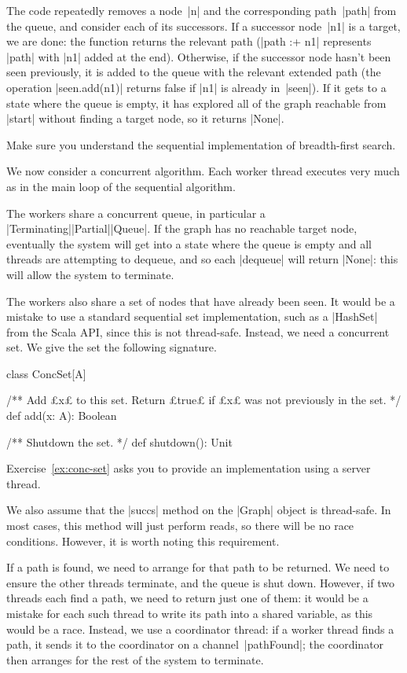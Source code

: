 The code repeatedly removes a node~|n| and the corresponding path~|path| from
the queue, and consider each of its successors.  If a successor node~|n1| is a
target, we are done: the function returns the relevant path (|path :+ n1|
represents |path| with |n1| added at the end).  Otherwise, if the successor
node hasn't been seen previously, it is added to the queue with the relevant
extended path (the operation |seen.add(n1)| returns false if |n1| is already
in~|seen|).  If it gets to a state where the queue is empty, it has explored
all of the graph reachable from |start| without finding a target node, so it
returns |None|.

\begin{instruction}
Make sure you understand the sequential implementation of breadth-first search.
\end{instruction}


We now consider a concurrent algorithm.  Each worker thread  executes very
much as in the main loop of the sequential algorithm.

The workers share a concurrent queue, in particular a
|Terminating|\-|Partial|\-|Queue|.  If the graph has no reachable
target node, eventually the system will get into a state where the queue is
empty and all threads are attempting to dequeue, and so each |dequeue| will
return |None|: this will allow the system to terminate.

The workers also share a set of nodes that have already been seen.  It would
be a mistake to use a standard sequential set implementation, such as a
|HashSet| from the Scala API, since this is not thread-safe.  Instead, we need
a concurrent set.  We give the set the following signature.
%
\begin{scala}
class ConcSet[A]{
  /** Add £x£ to this set.  Return £true£ if £x£ was not previously in the set. */
  def add(x: A): Boolean

  /** Shutdown the set. */
  def shutdown(): Unit
}
\end{scala}
%
Exercise~\ref{ex:conc-set} asks you to provide an implementation using a
server thread.

We also assume that the |succs| method on the |Graph| object is thread-safe.
In most cases, this method will just perform reads, so there will be no race
conditions.  However, it is worth noting this requirement. 

If a path is found, we need to arrange for that path to be returned.  We need
to ensure the other threads terminate, and the queue is shut down.  However,
if two threads each find a path, we need to return just one of them: it would
be a mistake for each such thread to write its path into a shared variable, as
this would be a race.  Instead, we use a coordinator thread: if a worker
thread finds a path, it sends it to the coordinator on a channel~|pathFound|;
the coordinator then arranges for the rest of the system to terminate.

